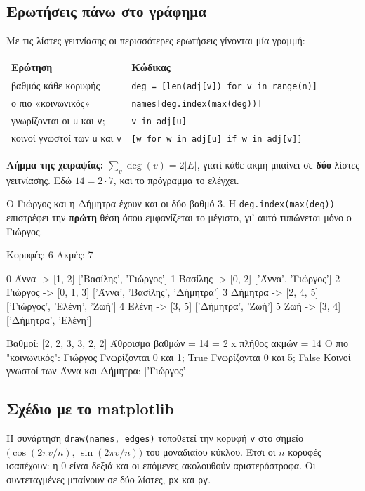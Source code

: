 \documentclass[11pt,a4paper]{article}
\newcommand{\code}[1]{\texttt{#1}}
\renewcommand{\_}{\textunderscore\allowbreak}
\begin{document}
\subsection{Ερωτήσεις πάνω στο γράφημα}
Με τις λίστες γειτνίασης οι περισσότερες ερωτήσεις γίνονται μία γραμμή:

\begin{center}
\begin{tabularx}{\linewidth}{@{}l Y@{}}
\toprule
\textbf{Ερώτηση} & \textbf{Κώδικας} \\
\midrule
βαθμός κάθε κορυφής & \code{deg = [len(adj[v]) for v in range(n)]} \\
ο πιο «κοινωνικός» & \code{names[deg.index(max(deg))]} \\
γνωρίζονται οι \code{u} και \code{v}; & \code{v in adj[u]} \\
κοινοί γνωστοί των \code{u} και \code{v} & \code{[w for w in adj[u] if w in adj[v]]} \\
\bottomrule
\end{tabularx}
\end{center}

\textbf{Λήμμα της χειραψίας:} $\sum_v \deg(v) = 2|E|$, γιατί κάθε ακμή μπαίνει σε \textbf{δύο} λίστες
γειτνίασης. Εδώ $14 = 2 \cdot 7$, και το πρόγραμμα το ελέγχει.

Ο Γιώργος και η Δήμητρα έχουν και οι δύο βαθμό 3. Η \code{deg.index(max(deg))} επιστρέφει την
\textbf{πρώτη} θέση όπου εμφανίζεται το μέγιστο, γι' αυτό τυπώνεται μόνο ο Γιώργος.

\begin{output}
Κορυφές: 6   Ακμές: 7

0 Άννα     -> [1, 2]   ['Βασίλης', 'Γιώργος']
1 Βασίλης  -> [0, 2]   ['Άννα', 'Γιώργος']
2 Γιώργος  -> [0, 1, 3]   ['Άννα', 'Βασίλης', 'Δήμητρα']
3 Δήμητρα  -> [2, 4, 5]   ['Γιώργος', 'Ελένη', 'Ζωή']
4 Ελένη    -> [3, 5]   ['Δήμητρα', 'Ζωή']
5 Ζωή      -> [3, 4]   ['Δήμητρα', 'Ελένη']

Βαθμοί: [2, 2, 3, 3, 2, 2]
Άθροισμα βαθμών = 14 = 2 x πλήθος ακμών = 14
Ο πιο "κοινωνικός": Γιώργος
Γνωρίζονται 0 και 1; True
Γνωρίζονται 0 και 5; False
Κοινοί γνωστοί των Άννα και Δήμητρα: ['Γιώργος']
\end{output}

\subsection{Σχέδιο με το matplotlib}
Η συνάρτηση \code{draw(names, edges)} τοποθετεί την κορυφή \code{v} στο σημείο
$\bigl(\cos(2\pi v/n),\, \sin(2\pi v/n)\bigr)$ του μοναδιαίου κύκλου. Έτσι οι $n$ κορυφές ισαπέχουν:
η 0 είναι δεξιά και οι επόμενες ακολουθούν αριστερόστροφα. Οι συντεταγμένες μπαίνουν σε δύο λίστες,
\code{px} και \code{py}.
\end{document}
